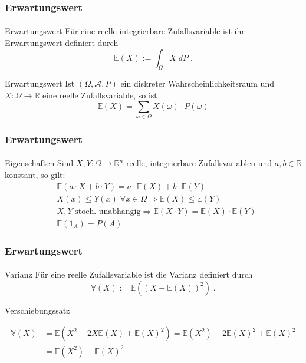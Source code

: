 \documentclass{beamer}
\begin{document}
\begin{frame}
    \frametitle{Erwartungswert}
\framesubtitle{}
\begin{block}{Erwartungswert}
Für eine reelle integrierbare Zufallsvariable ist ihr  Erwartungswert  definiert durch
$$ \mathbb{E} (X) := \int_{\Omega} X \; dP \; .$$
\end{block}
 \begin{block}{Erwartungswert}
Ist $(\Omega, \mathcal{A}, P)$ ein diskreter Wahrscheinlichkeitsraum und $X :\Omega \to \mathbb{R}$ eine reelle Zufallsvariable, so ist
$$ \mathbb{E} (X) = \sum_{\omega \in \Omega}  X(\omega) \cdot P(\omega)$$
\end{block}
 \end{frame}

 \begin{frame}
    \frametitle{Erwartungswert}
\framesubtitle{}
\begin{block}{Eigenschaften}
Sind $X,Y : \Omega \to \mathbb{R}^n$   reelle, integrierbare  Zufallsvariablen und $a,b \in \mathbb{R}$ konstant, so gilt:
\begin{align*}
& \mathbb{E}(a \cdot X + b \cdot Y) = a \cdot \mathbb{E}(X) + b \cdot \mathbb{E}(Y) \\
& X(x) \leq Y(x) \;  \forall x \in \Omega \Rightarrow \mathbb{E}(X) \leq \mathbb{E}(Y) \\
& X ,Y \text{ stoch. unabhängig} \Rightarrow   \mathbb{E}(X \cdot Y) =  \mathbb{E}(X) \cdot  \mathbb{E}(Y) \\
& \mathbb{E} (1_A) = P (A)
\end{align*}
\end{block}
 \end{frame}

 \begin{frame}
    \frametitle{Erwartungswert}
\framesubtitle{}
\begin{block}{Varianz}
Für eine reelle Zufallsvariable ist die Varianz definiert durch
$$ \mathbb{V} (X) :=  \mathbb{E}( (X - \mathbb{E}(X))^2) \; .$$
\end{block}
\begin{block}{Verschiebungssatz}

\begin{align*}
 \mathbb{V}(X) & = \mathbb{E}(X^2 - 2X \mathbb{E}(X) + \mathbb{E}(X)^2) = \mathbb{E}(X^2) - 2 \mathbb{E}(X)^2 +  \mathbb{E}(X)^2 \\
& =  \mathbb{E}(X^2) -  \mathbb{E}(X)^2 \\
\end{align*}
\end{block}
 \end{frame}
\end{document}
